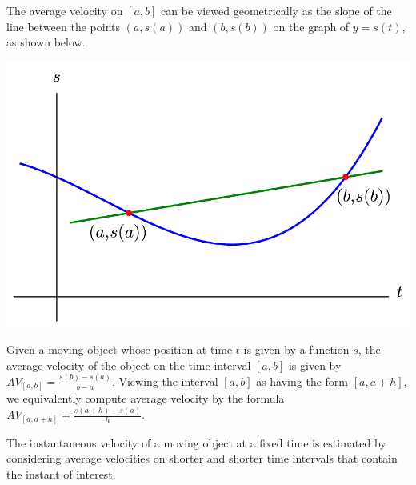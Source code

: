 \vspace*{-1cm}
\begin{summary}
\item The average velocity on $[a,b]$ can be viewed geometrically as the slope of the line between the points $(a,s(a))$ and $(b,s(b))$ on the graph of $y = s(t)$, as shown below.%

\begin{center}
\includegraphics[scale=.35]{figs/0/0-2_Summary.pdf}
\end{center}

\item Given a moving object whose position at time $t$ is given by a function $s$, the average velocity of the object on the time interval $[a,b]$ is given by $AV_{[a,b]} = \frac{s(b) - s(a)}{b-a}$.  Viewing the interval $[a,b]$ as having the form $[a,a+h]$, we equivalently compute average velocity by the formula $AV_{[a,a+h]} = \frac{s(a+h) - s(a)}{h}$.

\item The instantaneous velocity of a moving object at a fixed time is estimated by considering average velocities on shorter and shorter time intervals that contain the instant of interest.
\end{summary}

\clearpage

 

\cleardoublepage